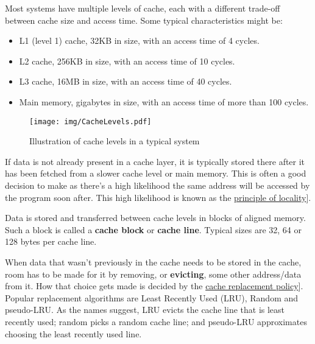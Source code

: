\documentclass[
  a4paper,
]{report}
\providecommand{\tightlist}{%
  \setlength{\itemsep}{0pt}\setlength{\parskip}{0pt}}
\begin{document}
Most systems have \label{__index_entry_107}{multiple
levels of cache}, each with a different
trade-off between \label{__index_entry_108}{cache
size} and
\label{__index_entry_109}{access
time}. Some typical characteristics might be:

\begin{itemize}
\tightlist
\item
  L1 (level 1) cache, 32KB in size, with an access time of 4 cycles.
\item
  L2 cache, 256KB in size, with an access time of 10 cycles.
\item
  L3 cache, 16MB in size, with an access time of 40 cycles.
\item
  Main memory, gigabytes in size, with an access time of more than 100
  cycles.
\end{itemize}

\begin{figure}
\centering
\texttt{[image: img/CacheLevels.pdf]}
\caption{Illustration of cache levels in a typical system}
\end{figure}

If data is not already present in a cache layer, it is typically stored
there after it has been fetched from a slower cache level or main
memory. This is often a good decision to make as there's a high
likelihood the same address will be accessed by the program soon after.
This high likelihood is known as the
\href{https://en.wikipedia.org/wiki/Locality_of_reference}{\label{__index_entry_110}{principle
of
locality}}{]}\label{__index_entry_111}{}.

Data is stored and transferred between cache levels in blocks of aligned
memory. Such a block is called a
\textbf{\label{__index_entry_112}{cache
block}} or
\textbf{\label{__index_entry_113}{cache
line}}. Typical sizes are 32, 64 or 128 bytes per
cache line.

When data that wasn't previously in the cache needs to be stored in the
cache, room has to be made for it by removing, or
\textbf{\label{__index_entry_114}{evicting}},
some other address/data from it. How that choice gets made is decided by
the
\href{https://en.wikipedia.org/wiki/Cache_replacement_policies}{\label{__index_entry_115}{cache
replacement policy}}{]}. Popular
replacement algorithms are
\label{__index_entry_116}{Least Recently Used
(LRU)},
\label{__index_entry_117}{Random}
and
\label{__index_entry_118}{pseudo-LRU}.
As the names suggest, LRU evicts the cache line that is least recently
used; random picks a random cache line; and pseudo-LRU approximates
choosing the least recently used line.
\end{document}
